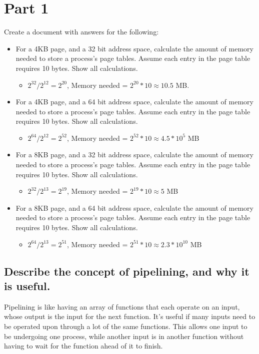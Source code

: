 \documentclass[onecolumn, draftclsnofoot,10pt, compsoc]{IEEEtran}
\begin{document}
\section{Part 1}
Create a document with answers for the following:
\begin{itemize}
    \item For a 4KB page, and a 32 bit address space, calculate the amount of memory needed to store a process's page tables. Assume each entry in the page table requires 10 bytes. Show all calculations.
    \begin{itemize}
        \item \(2 ^ {32} / 2^{12} = 2^{20}\), Memory needed = \(2^{20} * 10 \approx 10.5\) MB.
    \end{itemize}

    \item For a 4KB page, and a 64 bit address space, calculate the amount of memory needed to store a process's page tables. Assume each entry in the page table requires 10 bytes. Show all calculations.
    \begin{itemize}
        \item \(2^{64} / 2^{12} = 2^{52}\), Memory needed = \(2^{52} * 10 \approx 4.5 * 10 ^{5}\) MB
    \end{itemize}
    \item For a 8KB page, and a 32 bit address space, calculate the amount of memory needed to store a process's page tables. Assume each entry in the page table requires 10 bytes. Show all calculations.
    \begin{itemize}
        \item \(2^{32} / 2^{13} = 2^{19}\), Memory needed = \(2^{19} * 10 \approx 5\) MB
    \end{itemize}
    \item For a 8KB page, and a 64 bit address space, calculate the amount of memory needed to store a process's page tables. Assume each entry in the page table requires 10 bytes. Show all calculations.
    \begin{itemize}
        \item \(2^{64} / 2^{13} = 2^{51}\), Memory needed = \(2^{51} * 10 \approx 2.3 * 10 ^{10}\) MB
    \end{itemize}
\end{itemize}
\subsection{Describe the concept of pipelining, and why it is useful.}
Pipelining is like having an array of functions that each operate on an input, whose output is the input for the next function. It’s useful if many inputs need to be operated upon through a lot of the same functions. This allows one input to be undergoing one process, while another input is in another function without having to wait for the function ahead of it to finish. 
\end{document}
